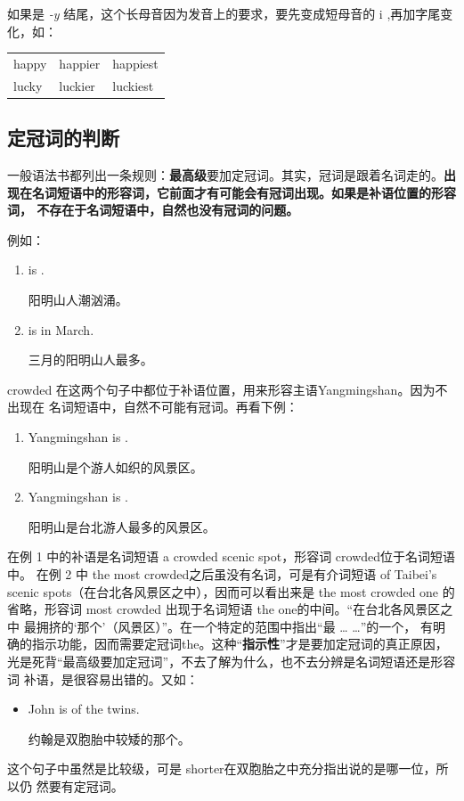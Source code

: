 如果是 \emph{-y} 结尾，这个长母音因为发音上的要求，要先变成短母音的 i
,再加字尾变化，如：
\begin{longtable}[]{@{}lll@{}}
  happy & happier & happiest \\
  lucky & luckier & luckiest \\
\end{longtable}

\subsection{定冠词的判断}

一般语法书都列出一条规则：\textbf{最高级}要加定冠词。其实，冠词是跟着名词走的。\textbf{出
  现在名词短语中的形容词，它前面才有可能会有冠词出现。如果是补语位置的形容词，
  不存在于名词短语中，自然也没有冠词的问题。}

例如：
\begin{enumerate}
\item  {} is .

  阳明山人潮汹涌。
\item  {} is  in March.

  三月的阳明山人最多。
\end{enumerate}
crowded 在这两个句子中都位于补语位置，用来形容主语Yangmingshan。因为不出现在
名词短语中，自然不可能有冠词。再看下例：
\begin{enumerate}
\item  Yangmingshan is .

  阳明山是个游人如织的风景区。
\item  Yangmingshan is .

  阳明山是台北游人最多的风景区。
\end{enumerate}
在例 1 中的补语是名词短语 a crowded scenic spot，形容词 crowded位于名词短语中。
在例 2 中 the most crowded之后虽没有名词，可是有介词短语 of Taibei's
scenic spots（在台北各风景区之中），因而可以看出来是 the most crowded one 的
省略，形容词 most crowded 出现于名词短语 the one的中间。“在台北各风景区之中
最拥挤的`那个'（风景区）”。在一个特定的范围中指出“最 \ldots{} \ldots”的一个，
有明确的指示功能，因而需要定冠词the。这种“\textbf{指示性}”才是要加定冠词的真正原因，
光是死背“最高级要加定冠词”，不去了解为什么，也不去分辨是名词短语还是形容词
补语，是很容易出错的。又如：

\begin{itemize}
\item  John is  of the twins.

  约翰是双胞胎中较矮的那个。
\end{itemize}
这个句子中虽然是比较级，可是 shorter在双胞胎之中充分指出说的是哪一位，所以仍
然要有定冠词。

